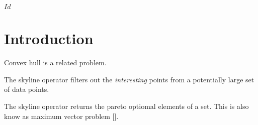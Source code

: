 
\svnInfo $Id$

\chapter{Introduction\sectionRevision}
\label{chap:Introduction}
Convex hull is a related problem.

The skyline operator \citep[introduced in][]{BKS2001} filters out the \emph{interesting} points from a potentially large set of data points.


The skyline operator returns the pareto optiomal elements of a set. This is also know as maximum vector problem [\citet{BKS2001}].




